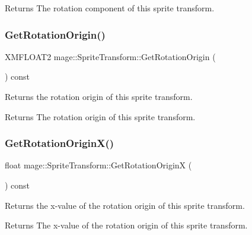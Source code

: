 \begin{DoxyReturn}{Returns}
The rotation component of this sprite transform. 
\end{DoxyReturn}
\hypertarget{structmage_1_1_sprite_transform_af3a00260c5346a32a9f81efcf0f48a6a}{}\label{structmage_1_1_sprite_transform_af3a00260c5346a32a9f81efcf0f48a6a} 
\subsubsection{\texorpdfstring{Get\+Rotation\+Origin()}{GetRotationOrigin()}}
{\footnotesize\ttfamily X\+M\+F\+L\+O\+A\+T2 mage\+::\+Sprite\+Transform\+::\+Get\+Rotation\+Origin (\begin{DoxyParamCaption}{ }\end{DoxyParamCaption}) const}

Returns the rotation origin of this sprite transform.

\begin{DoxyReturn}{Returns}
The rotation origin of this sprite transform. 
\end{DoxyReturn}
\hypertarget{structmage_1_1_sprite_transform_abf3a72d9f594aa157608070d69f4428e}{}\label{structmage_1_1_sprite_transform_abf3a72d9f594aa157608070d69f4428e} 
\subsubsection{\texorpdfstring{Get\+Rotation\+Origin\+X()}{GetRotationOriginX()}}
{\footnotesize\ttfamily float mage\+::\+Sprite\+Transform\+::\+Get\+Rotation\+OriginX (\begin{DoxyParamCaption}{ }\end{DoxyParamCaption}) const}

Returns the x-\/value of the rotation origin of this sprite transform.

\begin{DoxyReturn}{Returns}
The x-\/value of the rotation origin of this sprite transform. 
\end{DoxyReturn}
\hypertarget{structmage_1_1_sprite_transform_a0f6056a96c419817211efce6687e1d89}{}\label{structmage_1_1_sprite_transform_a0f6056a96c419817211efce6687e1d89} 
